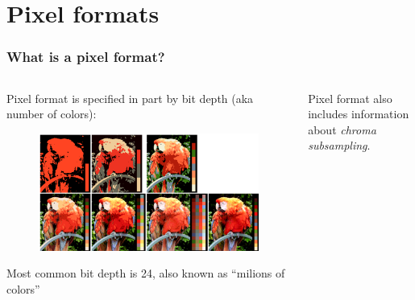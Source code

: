 \documentclass[aspectratio=169]{beamer}
\begin{document}
\section{Pixel formats}

\begin{frame}
    \frametitle{What is a pixel format?}
    \begin{columns}
        \begin{column}{.5\textwidth}
            Pixel format is specified in part by bit depth (aka number of colors):

            \begin{figure}
                \includegraphics[width=\textwidth]{colors.png}
                \centering
            \end{figure}
            Most common bit depth is 24, also known as ``milions of colors''
        \end{column}
        \begin{column}{.5\textwidth}
            Pixel format also includes information about \emph{chroma subsampling}.
        \end{column}
    \end{columns}
\end{frame}
\end{document}
